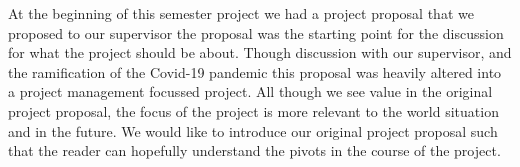 At the beginning of this semester project we had a project proposal that we proposed to our supervisor the proposal was the starting point for the discussion for what the project should be about.
Though discussion with our supervisor, and the ramification of the Covid-19 pandemic this proposal was heavily altered into a project management focussed project.
All though we see value in the original project proposal, the focus of the project is more relevant to the world situation and in the future.
We would like to introduce our original project proposal such that the reader can hopefully understand the pivots in the course of the project. 
